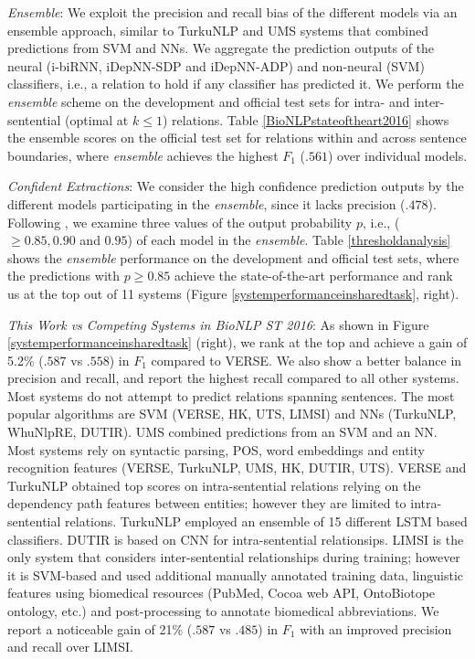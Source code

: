 \documentclass[letterpaper]{article} \usepackage{aaai19}  \usepackage{times}  \usepackage{helvet}  \usepackage{courier}  \usepackage{url}  \usepackage{graphicx}
\begin{document}
\textit{Ensemble}: We exploit the precision and recall bias of the different models via an ensemble approach, similar to TurkuNLP \cite{mehryary2016deep} 
and UMS \cite{deleger2016overview} systems that combined predictions from SVM and NNs.   
We aggregate the prediction outputs of the neural (i-biRNN, iDepNN-SDP and iDepNN-ADP) and non-neural (SVM) classifiers, i.e.,  
a relation to hold if any classifier has predicted it. We perform the {\it ensemble} scheme on the development and official test sets 
for intra- and inter-sentential (optimal at $k \le 1$) relations. 
Table \ref{BioNLPstateoftheart2016} shows the ensemble scores on the official test set for relations  within and across 
sentence boundaries, where {\it ensemble} achieves the highest $F_1$ ($.561$) over individual models.

\textit{Confident Extractions}: We consider the high confidence prediction outputs by the different models participating in the {\it ensemble}, 
since it lacks precision ($.478$). Following \citeauthor{peng2017cross} , we examine three values of the output probability 
$p$, i.e., ($\ge 0.85, 0.90$ and $0.95$) of each model in the {\it ensemble}. 
Table \ref{thresholdanalysis} shows the {\it ensemble} performance on the development and official test sets, where the predictions with $p \ge 0.85$ 
achieve the state-of-the-art performance and rank us at the
top out of 11 systems
(Figure \ref{systemperformanceinsharedtask}, right).

\textit{This Work vs Competing Systems in BioNLP ST 2016}:
As shown in Figure  \ref{systemperformanceinsharedtask} (right), we rank at the top  and achieve 
a gain of 5.2\% ($.587$ vs $.558$) in $F_1$ compared to VERSE.  
We also show a better balance in precision and recall, and report the highest recall compared to all other systems.  
Most systems do not attempt to predict relations spanning sentences. 
The most popular algorithms are SVM (VERSE, HK, UTS, LIMSI) and NNs (TurkuNLP, WhuNlpRE, DUTIR). 
UMS combined predictions from an SVM and an NN. 
Most systems rely on syntactic parsing, POS,  
word embeddings and entity recognition features 
(VERSE, TurkuNLP, UMS, HK, DUTIR, UTS). 
VERSE and TurkuNLP obtained top scores on intra-sentential relations relying on the dependency path features between entities; 
however they are limited to intra-sentential relations. TurkuNLP employed an ensemble of 15 different LSTM based classifiers.  
DUTIR is based on CNN for intra-sentential relationsips.  
LIMSI is the only system that considers inter-sentential relationships during training; however it is SVM-based and used additional manually annotated training data,  linguistic features using biomedical resources (PubMed, Cocoa web API, OntoBiotope ontology, etc.) and post-processing to annotate biomedical abbreviations. 
We report a noticeable gain of 21\% ($.587$ vs $.485$) in $F_1$ with an improved precision and recall over LIMSI. 
\end{document}
